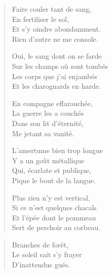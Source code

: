 \begin{verse}\quatrain
  Faire couler tant de sang,\\  %
  En fertiliser le sol,\\  %
  Et s’y oindre abondamment.\\  %
  Rien d’autre ne me console.

  Oui, le sang dont on se farde\\  %
  Sur les champs où sont tombés\\  %
  Les corps que j’ai enjambés\\  %
  Et les charognards en harde.

  En compagne effarouchée,\\  %
  La guerre les a couchés\\  %
  Dans son lit d’éternité,\\  %
  Me jetant sa vanité.

  L’amertume bien trop longue\\  %
  Y a un goût métallique\\  %
  Qui, écarlate et publique,\\  %
  Pique le bout de la langue.

  Plus rien n’y est vertical,\\  %
  Si ce n’est quelques chacals\\  %
  Et l’épée dont le pommeau\\  %
  Sert de perchoir au corbeau.
\end{verse}

\begin{verse}\haiku
  Branches de forêt,\\  %
  Le soleil sait s’y frayer\\  %
  D’inattendus gués.
\end{verse}

